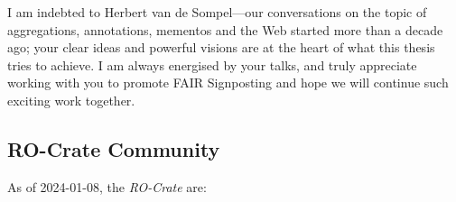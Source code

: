 I am indebted to Herbert van de Sompel---our conversations on the topic of aggregations, annotations, mementos and the Web started more than a decade ago; your clear ideas and powerful visions are at the heart of what this thesis tries to achieve. I am always energised by your talks, and truly appreciate working with you to promote FAIR Signposting and hope we will continue such exciting work together.


\subsection{RO-Crate Community}\label{communitylist}
\label{ro-crate-community}

As of 2024-01-08, the \emph{RO-Crate}  are:

